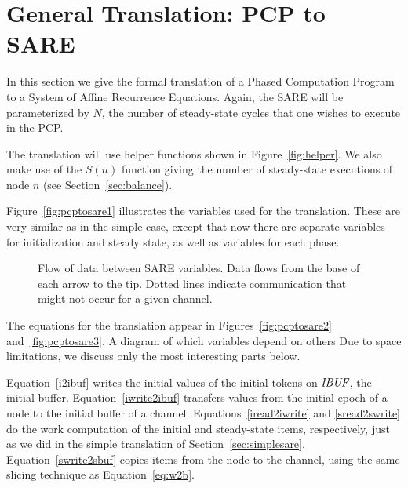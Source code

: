 \section{General Translation: PCP to SARE}
\label{sec:translate}

In this section we give the formal translation of a Phased Computation
Program to a System of Affine Recurrence Equations.  Again, the SARE
will be parameterized by $N$, the number of steady-state cycles that
one wishes to execute in the PCP.  

The translation will use helper functions shown in
Figure~\ref{fig:helper}.  We also make use of the $S(n)$ function
giving the number of steady-state executions of node $n$ (see
Section~\ref{sec:balance}).



Figure~\ref{fig:pcptosare1} illustrates the variables used for the
translation.  These are very similar as in the simple case, except
that now there are separate variables for initialization and steady
state, as well as variables for each phase.

\begin{figure}
\centering
{}
\parbox{4in}{\caption{Flow of data between SARE variables.  Data flows from the base of each arrow to the tip.  Dotted lines indicate communication that might not occur for a given channel.}
\protect\label{fig:communic}}
\end{figure}

The equations for the translation appear in
Figures~\ref{fig:pcptosare2} and~\ref{fig:pcptosare3}.  A diagram of
which variables depend on others Due to space limitations, we discuss
only the most interesting parts below.

Equation~\ref{i2ibuf} writes the initial values of the initial tokens
on $\mbox{\it IBUF}$, the initial buffer.  Equation~\ref{iwrite2ibuf}
transfers values from the initial epoch of a node to the initial buffer
of a channel.  Equations~\ref{iread2iwrite} and \ref{sread2swrite} do
the work computation of the initial and steady-state items,
respectively, just as we did in the simple translation of
Section~\ref{sec:simplesare}.  Equation~\ref{swrite2sbuf} copies items
from the node to the channel, using the same slicing technique as
Equation~\ref{eq:w2b}.

